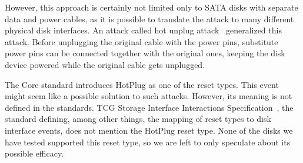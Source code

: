 However, this approach is certainly not limited only to SATA disks with separate data and power cables, as it is possible to translate the attack to many different physical disk interfaces. An attack called hot unplug attack~\cite{bypassing_in_enterprise} generalized this attack. 
Before unplugging the original cable with the power pins, substitute power pins can be connected together with the original ones, keeping the disk device powered while the original cable gets unplugged. 

The Core standard introduces HotPlug as one of the reset types. This event might seem like a possible solution to such attacks. However,  its meaning is not defined in the standards. TCG Storage Interface Interactions Specification~\cite{tcg-siis}, the standard defining, among other things, the mapping of reset types to disk interface events, does not mention the HotPlug reset type. None of the disks we have tested supported this reset type, so we are left to only speculate about its possible efficacy.








